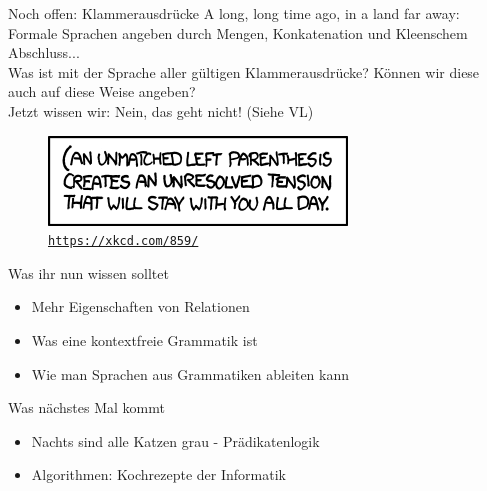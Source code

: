 

%

\begin{frame}{Noch offen: Klammerausdrücke}
	A long, long time ago, in a land far away:\\
	Formale Sprachen angeben durch Mengen, Konkatenation und Kleenschem Abschluss...\\
	Was ist mit der Sprache aller gültigen Klammerausdrücke? Können wir diese auch auf diese Weise angeben?\\[1em]
	\pause
	Jetzt wissen wir: Nein, das geht nicht! (Siehe VL)\\[1em]
	
	\begin{figure}[H]
		\centering
		\includegraphics[scale=0.7]{xkcd/(.png}
		\vspace{-7pt}
		\caption{ \texttt{\url{https://xkcd.com/859/}} }
	\end{figure}
\end{frame}




\begin{frame}	
	\begin{block}{Was ihr nun wissen solltet}
		\begin{itemize}
			\item Mehr Eigenschaften von Relationen
			\item Was eine kontextfreie Grammatik ist
			\item Wie man Sprachen aus Grammatiken ableiten kann
		\end{itemize}
	\end{block}
	
	\begin{block}{Was nächstes Mal kommt}
		\begin{itemize}
			\item Nachts sind alle Katzen grau - Prädikatenlogik
			\item Algorithmen: Kochrezepte der Informatik
		\end{itemize}
	\end{block}
\end{frame}

\slideThanks

